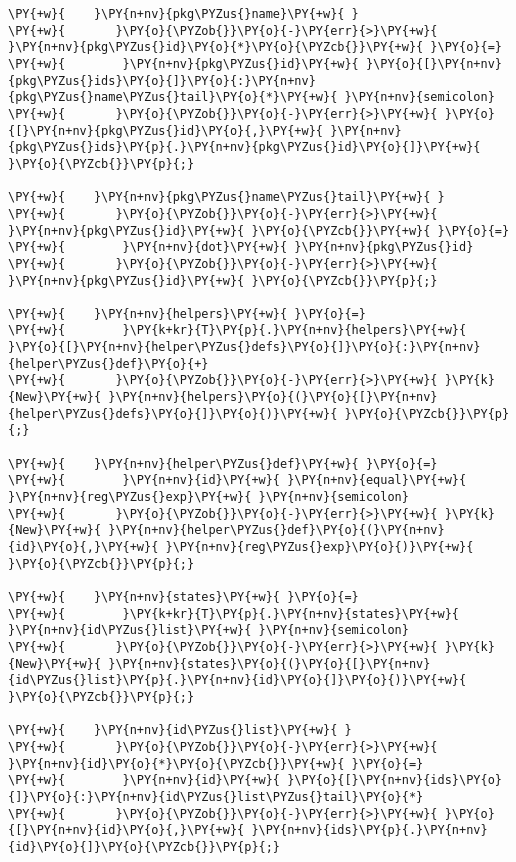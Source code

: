\begin{Verbatim}[commandchars=\\\{\}]
\PY{+w}{    }\PY{n+nv}{pkg\PYZus{}name}\PY{+w}{ }
\PY{+w}{	   }\PY{o}{\PYZob{}}\PY{o}{-}\PY{err}{>}\PY{+w}{ }\PY{n+nv}{pkg\PYZus{}id}\PY{o}{*}\PY{o}{\PYZcb{}}\PY{+w}{ }\PY{o}{=}
\PY{+w}{        }\PY{n+nv}{pkg\PYZus{}id}\PY{+w}{ }\PY{o}{[}\PY{n+nv}{pkg\PYZus{}ids}\PY{o}{]}\PY{o}{:}\PY{n+nv}{pkg\PYZus{}name\PYZus{}tail}\PY{o}{*}\PY{+w}{ }\PY{n+nv}{semicolon}
\PY{+w}{	   }\PY{o}{\PYZob{}}\PY{o}{-}\PY{err}{>}\PY{+w}{ }\PY{o}{[}\PY{n+nv}{pkg\PYZus{}id}\PY{o}{,}\PY{+w}{ }\PY{n+nv}{pkg\PYZus{}ids}\PY{p}{.}\PY{n+nv}{pkg\PYZus{}id}\PY{o}{]}\PY{+w}{ }\PY{o}{\PYZcb{}}\PY{p}{;}

\PY{+w}{    }\PY{n+nv}{pkg\PYZus{}name\PYZus{}tail}\PY{+w}{ }
\PY{+w}{	   }\PY{o}{\PYZob{}}\PY{o}{-}\PY{err}{>}\PY{+w}{ }\PY{n+nv}{pkg\PYZus{}id}\PY{+w}{ }\PY{o}{\PYZcb{}}\PY{+w}{ }\PY{o}{=}
\PY{+w}{        }\PY{n+nv}{dot}\PY{+w}{ }\PY{n+nv}{pkg\PYZus{}id}
\PY{+w}{	   }\PY{o}{\PYZob{}}\PY{o}{-}\PY{err}{>}\PY{+w}{ }\PY{n+nv}{pkg\PYZus{}id}\PY{+w}{ }\PY{o}{\PYZcb{}}\PY{p}{;}

\PY{+w}{    }\PY{n+nv}{helpers}\PY{+w}{ }\PY{o}{=}
\PY{+w}{        }\PY{k+kr}{T}\PY{p}{.}\PY{n+nv}{helpers}\PY{+w}{ }\PY{o}{[}\PY{n+nv}{helper\PYZus{}defs}\PY{o}{]}\PY{o}{:}\PY{n+nv}{helper\PYZus{}def}\PY{o}{+}
\PY{+w}{	   }\PY{o}{\PYZob{}}\PY{o}{-}\PY{err}{>}\PY{+w}{ }\PY{k}{New}\PY{+w}{ }\PY{n+nv}{helpers}\PY{o}{(}\PY{o}{[}\PY{n+nv}{helper\PYZus{}defs}\PY{o}{]}\PY{o}{)}\PY{+w}{ }\PY{o}{\PYZcb{}}\PY{p}{;}

\PY{+w}{    }\PY{n+nv}{helper\PYZus{}def}\PY{+w}{ }\PY{o}{=}
\PY{+w}{        }\PY{n+nv}{id}\PY{+w}{ }\PY{n+nv}{equal}\PY{+w}{ }\PY{n+nv}{reg\PYZus{}exp}\PY{+w}{ }\PY{n+nv}{semicolon}
\PY{+w}{	   }\PY{o}{\PYZob{}}\PY{o}{-}\PY{err}{>}\PY{+w}{ }\PY{k}{New}\PY{+w}{ }\PY{n+nv}{helper\PYZus{}def}\PY{o}{(}\PY{n+nv}{id}\PY{o}{,}\PY{+w}{ }\PY{n+nv}{reg\PYZus{}exp}\PY{o}{)}\PY{+w}{ }\PY{o}{\PYZcb{}}\PY{p}{;}

\PY{+w}{    }\PY{n+nv}{states}\PY{+w}{ }\PY{o}{=}
\PY{+w}{        }\PY{k+kr}{T}\PY{p}{.}\PY{n+nv}{states}\PY{+w}{ }\PY{n+nv}{id\PYZus{}list}\PY{+w}{ }\PY{n+nv}{semicolon}
\PY{+w}{	   }\PY{o}{\PYZob{}}\PY{o}{-}\PY{err}{>}\PY{+w}{ }\PY{k}{New}\PY{+w}{ }\PY{n+nv}{states}\PY{o}{(}\PY{o}{[}\PY{n+nv}{id\PYZus{}list}\PY{p}{.}\PY{n+nv}{id}\PY{o}{]}\PY{o}{)}\PY{+w}{ }\PY{o}{\PYZcb{}}\PY{p}{;}

\PY{+w}{    }\PY{n+nv}{id\PYZus{}list}\PY{+w}{ }
\PY{+w}{	   }\PY{o}{\PYZob{}}\PY{o}{-}\PY{err}{>}\PY{+w}{ }\PY{n+nv}{id}\PY{o}{*}\PY{o}{\PYZcb{}}\PY{+w}{ }\PY{o}{=}
\PY{+w}{        }\PY{n+nv}{id}\PY{+w}{ }\PY{o}{[}\PY{n+nv}{ids}\PY{o}{]}\PY{o}{:}\PY{n+nv}{id\PYZus{}list\PYZus{}tail}\PY{o}{*}
\PY{+w}{	   }\PY{o}{\PYZob{}}\PY{o}{-}\PY{err}{>}\PY{+w}{ }\PY{o}{[}\PY{n+nv}{id}\PY{o}{,}\PY{+w}{ }\PY{n+nv}{ids}\PY{p}{.}\PY{n+nv}{id}\PY{o}{]}\PY{o}{\PYZcb{}}\PY{p}{;}


\end{Verbatim}

